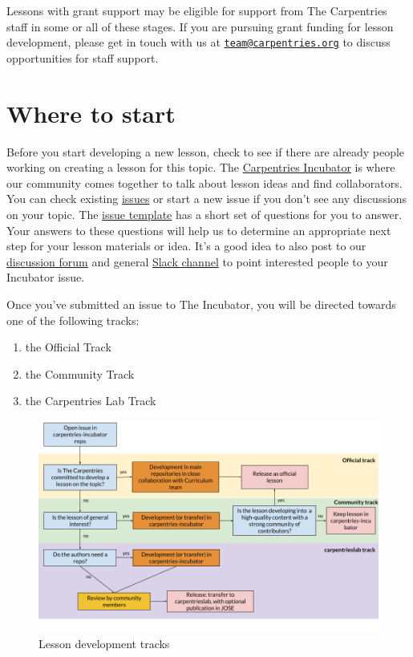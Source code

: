\documentclass[]{book}
\providecommand{\tightlist}{%
  \setlength{\itemsep}{0pt}\setlength{\parskip}{0pt}}
\begin{document}
Lessons with grant support may be eligible for
support from The Carpentries staff in some or all of
these stages. If you are pursuing grant funding for
lesson development, please get in touch with us at
\href{mailto:team@carpentries.org}{\nolinkurl{team@carpentries.org}} to discuss opportunities for staff
support.

\hypertarget{where-to-start}{%
\section{Where to start}\label{where-to-start}}

Before you start developing a new lesson, check
to see if there are already people working on creating
a lesson for this topic. The \href{https://github.com/carpentries-incubator/proposals/blob/master/README.md}{Carpentries Incubator} is where our community comes
together to talk about lesson ideas and find
collaborators. You can check existing \href{https://github.com/carpentries-incubator/proposals/issues}{issues}
or start a new issue if you don't see any discussions
on your topic. The \href{https://github.com/carpentries-incubator/proposals/blob/master/ISSUE_TEMPLATE.md}{issue template} has
a short set of questions for you to answer. Your answers
to these questions will help us to determine an
appropriate next step for your lesson materials or
idea. It's a good idea to also post to our
\href{https://carpentries.topicbox.com/groups/discuss}{discussion forum} and general \href{https://swc-slack-invite.herokuapp.com/}{Slack channel} to point interested people to your
Incubator issue.

Once you've submitted an issue to The Incubator,
you will be directed towards one of the following
tracks:

\begin{enumerate}
\def\labelenumi{\arabic{enumi}.}
\tightlist
\item
  the Official Track
\item
  the Community Track
\item
  the Carpentries Lab Track
\end{enumerate}

\begin{figure}
\centering
\includegraphics{figures/lesson-development-tracks.png}
\caption{Lesson development tracks}
\end{figure}
\end{document}

